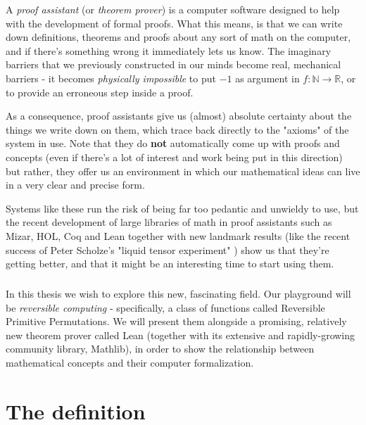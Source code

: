 \documentclass[oneside]{book}
\theoremstyle{definition}
\theoremstyle{remark}
\theoremstyle{plain}
\newcommand{\NN}{\mathbb{N}}
\newcommand{\RR}{\mathbb{R}}
\begin{document}
A \textit{proof assistant} (or \textit{theorem prover}) is a computer software designed to help with
the development of formal proofs.
What this means, is that we can write down definitions, theorems and proofs about any sort of math on the computer,
and if there's something wrong it immediately lets us know.
The imaginary barriers that we previously constructed in our minds become
real, mechanical barriers - it becomes \textit{physically impossible} to put $-1$ as argument in $f : \NN \to \RR$,
or to provide an erroneous step inside a proof.

As a consequence, proof assistants give us (almost) absolute certainty about the things we write down on them,
which trace back directly to the "axioms" of the system in use.
Note that they do \textbf{not} automatically come up with proofs and concepts
(even if there's a lot of interest and work being put in this direction) but rather,
they offer us an environment in which our mathematical ideas can live in a very clear and precise form.

Systems like these run the risk of being far too pedantic and unwieldy to use,
but the recent development of large libraries of math in proof assistants such as Mizar, HOL, Coq and Lean
together with new landmark results (like the recent success of Peter Scholze's "liquid tensor experiment" \cite{quanta})
show us that they're getting better, and that it might be an interesting time to start using them.

\paragraph{}

In this thesis we wish to explore this new, fascinating field.
Our playground will be \textit{reversible computing} - specifically, a class of functions
called Reversible Primitive Permutations. We will present them alongside a promising, relatively new theorem prover
called Lean (together with its extensive and rapidly-growing community library, Mathlib),
in order to show the relationship between mathematical concepts and their computer formalization.


% 
% 

\chapter{The definition}
\end{document}
